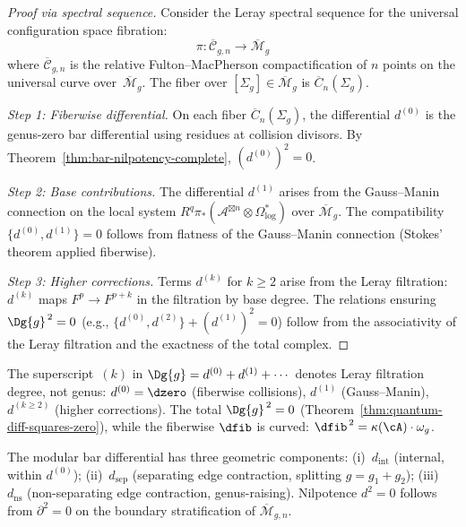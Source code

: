 \begin{proof}[Proof via spectral sequence]
Consider the Leray spectral sequence for the universal configuration space fibration:
\begin{equation}
\pi: \overline{\mathcal{C}}_{g,n} \to \overline{\mathcal{M}}_{g}
\end{equation}
where $\overline{\mathcal{C}}_{g,n}$ is the relative Fulton--MacPherson compactification of $n$ points on the universal curve over~$\overline{\mathcal{M}}_g$. The fiber over $[\Sigma_g] \in \overline{\mathcal{M}}_g$ is $\overline{C}_n(\Sigma_g)$.

\emph{Step 1: Fiberwise differential.} On each fiber $\overline{C}_n(\Sigma_g)$, the differential $d^{(0)}$ is the genus-zero bar differential using residues at collision divisors. By Theorem~\ref{thm:bar-nilpotency-complete}, $(d^{(0)})^2 = 0$.

\emph{Step 2: Base contributions.} The differential $d^{(1)}$ arises from the Gauss--Manin connection on the local system $R^q\pi_*(\mathcal{A}^{\boxtimes n} \otimes \Omega^*_{\log})$ over $\overline{\mathcal{M}}_g$. The compatibility $\{d^{(0)}, d^{(1)}\} = 0$ follows from flatness of the Gauss--Manin connection (Stokes' theorem applied fiberwise).

\emph{Step 3: Higher corrections.} Terms $d^{(k)}$ for $k \geq 2$ arise from the Leray filtration: $d^{(k)}$ maps $F^p \to F^{p+k}$ in the filtration by base degree. The relations ensuring $\Dg{g}^{\,2} = 0$ (e.g., $\{d^{(0)}, d^{(2)}\} + (d^{(1)})^2 = 0$) follow from the associativity of the Leray filtration and the exactness of the total complex.
\end{proof}

\begin{remark}
\label{rem:differential-notation}
The superscript~$(k)$ in $\Dg{g}=d^{(0)}+d^{(1)}+\cdots$ denotes
Leray filtration degree, not genus: $d^{(0)}=\dzero$ (fiberwise
collisions), $d^{(1)}$ (Gauss--Manin), $d^{(k\geq 2)}$ (higher
corrections).  The total $\Dg{g}^{\,2}=0$
(Theorem~\ref{thm:quantum-diff-squares-zero}), while the fiberwise
$\dfib$ is curved: $\dfib^{\,2}=\kappa(\cA)\cdot\omega_g$.
\end{remark}

\begin{remark}
\label{rem:modular-differential-decomposition}
The modular bar differential has three geometric components:
(i)~$d_{\mathrm{int}}$ (internal, within $d^{(0)}$);
(ii)~$d_{\mathrm{sep}}$ (separating edge contraction, splitting
$g=g_1+g_2$);
(iii)~$d_{\mathrm{ns}}$ (non-separating edge contraction,
genus-raising).
Nilpotence $d^2=0$ follows from $\partial^2=0$ on the boundary
stratification of $\overline{\mathcal{M}}_{g,n}$.
\end{remark}

